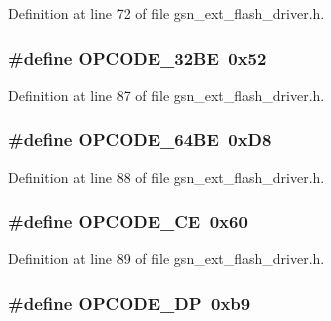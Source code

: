 Definition at line 72 of file gsn\_\-ext\_\-flash\_\-driver.h.

\hypertarget{a00496_a5416ef17d7dca4bd942b39e05571cc0f}{
\subsubsection[{OPCODE\_\-32BE}]{\setlength{\rightskip}{0pt plus 5cm}\#define OPCODE\_\-32BE~0x52}}
\label{a00496_a5416ef17d7dca4bd942b39e05571cc0f}


Definition at line 87 of file gsn\_\-ext\_\-flash\_\-driver.h.

\hypertarget{a00496_a85cd9f0f5ccb723e21f141a5bc1052d0}{
\subsubsection[{OPCODE\_\-64BE}]{\setlength{\rightskip}{0pt plus 5cm}\#define OPCODE\_\-64BE~0xD8}}
\label{a00496_a85cd9f0f5ccb723e21f141a5bc1052d0}


Definition at line 88 of file gsn\_\-ext\_\-flash\_\-driver.h.

\hypertarget{a00496_a167172ea361250e989670f06208a3fb3}{
\subsubsection[{OPCODE\_\-CE}]{\setlength{\rightskip}{0pt plus 5cm}\#define OPCODE\_\-CE~0x60}}
\label{a00496_a167172ea361250e989670f06208a3fb3}


Definition at line 89 of file gsn\_\-ext\_\-flash\_\-driver.h.

\hypertarget{a00496_aa2192e62ba531b168de0f2ced5ca0b0c}{
\subsubsection[{OPCODE\_\-DP}]{\setlength{\rightskip}{0pt plus 5cm}\#define OPCODE\_\-DP~0xb9}}
\label{a00496_aa2192e62ba531b168de0f2ced5ca0b0c}


